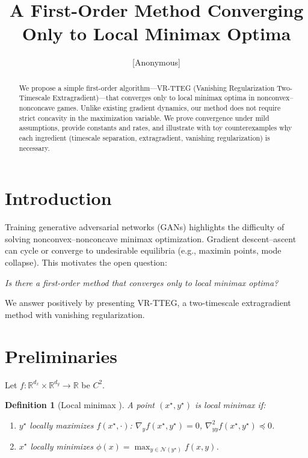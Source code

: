 \documentclass[11pt]{article}
\title{A First-Order Method Converging Only to Local Minimax Optima}
\author{[Anonymous]}
\date{}
\newtheorem{definition}{Definition}
\begin{document}
\maketitle

\begin{abstract}
We propose a simple first-order algorithm---VR-TTEG (Vanishing Regularization Two-Timescale Extragradient)---that converges only to local minimax optima in nonconvex--nonconcave games. Unlike existing gradient dynamics, our method does not require strict concavity in the maximization variable. We prove convergence under mild assumptions, provide constants and rates, and illustrate with toy counterexamples why each ingredient (timescale separation, extragradient, vanishing regularization) is necessary.
\end{abstract}

\section{Introduction}
Training generative adversarial networks (GANs) highlights the difficulty of solving nonconvex--nonconcave minimax optimization. Gradient descent--ascent can cycle or converge to undesirable equilibria (e.g., maximin points, mode collapse). This motivates the open question:

\emph{Is there a first-order method that converges only to local minimax optima?}

We answer positively by presenting VR-TTEG, a two-timescale extragradient method with vanishing regularization.

\section{Preliminaries}
Let $f:\mathbb{R}^{d_x}\times \mathbb{R}^{d_y}\to\mathbb{R}$ be $C^2$. 

\begin{definition}[Local minimax \cite{jin2020}]
A point $(x^\star,y^\star)$ is local minimax if:
\begin{enumerate}
    \item $y^\star$ locally maximizes $f(x^\star,\cdot)$:
    $\nabla_y f(x^\star,y^\star)=0$, $\nabla^2_{yy} f(x^\star,y^\star)\preceq 0$.
    \item $x^\star$ locally minimizes $\phi(x)=\max_{y\in \mathcal{N}(y^\star)} f(x,y)$.
\end{enumerate}
\end{definition}
\end{document}
